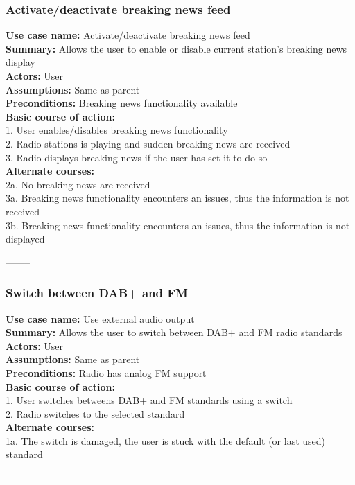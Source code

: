 \documentclass[11pt]{article}
\begin{document}
\subsubsection{Activate/deactivate breaking news feed}
\textbf{Use case name:} Activate/deactivate breaking news feed\\
\textbf{Summary:} Allows the user to enable or disable current station's breaking news display\\
\textbf{Actors:} User\\
\textbf{Assumptions:} Same as parent\\
\textbf{Preconditions:} Breaking news functionality available\\
\textbf{Basic course of action:}\\
\hspace*{10mm}1. User enables/disables breaking news functionality\\
\hspace*{10mm}2. Radio stations is playing and sudden breaking news are received\\
\hspace*{10mm}3. Radio displays breaking news if the user has set it to do so\\
\textbf{Alternate courses:}\\
\hspace*{10mm}2a. No breaking news are received\\
\hspace*{10mm}3a. Breaking news functionality encounters an issues, thus the information is not received\\
\hspace*{10mm}3b. Breaking news functionality encounters an issues, thus the information is not displayed
\begin{center}--------\end{center}

\subsubsection{Switch between DAB+ and FM}
\textbf{Use case name:} Use external audio output\\
\textbf{Summary:} Allows the user to switch between DAB+ and FM radio standards\\
\textbf{Actors:} User\\
\textbf{Assumptions:} Same as parent\\
\textbf{Preconditions:} Radio has analog FM support\\
\textbf{Basic course of action:}\\
\hspace*{10mm}1. User switches betweens DAB+ and FM standards using a switch\\
\hspace*{10mm}2. Radio switches to the selected standard\\
\textbf{Alternate courses:}\\
\hspace*{10mm}1a. The switch is damaged, the user is stuck with the default (or last used) standard
\begin{center}--------\end{center}
\end{document}
